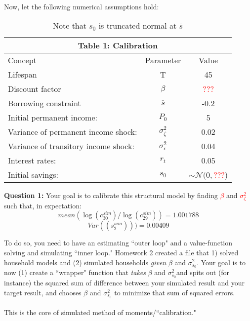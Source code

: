 \documentclass[11pt]{article}
\begin{document}
Now, let the following numerical assumptions hold:
\begin{table}[ht!]
\centering
\begin{tabular}{lcc}
\hline
\hline
\multicolumn{3}{c}{Table 1: Calibration}\\
\hline
Concept & Parameter & Value \\ 
Lifespan & T & 45 \\
Discount factor & $\beta$ & \textcolor{red}{???}\\
Borrowing constraint & $\overline{s}$ & -0.2 \\
Initial permanent income:  & $P_0$ & 5\\
Variance of permanent income shock:  & $\sigma^2_\zeta$ & 0.02\\
Variance of transitory income shock:  & $\sigma^2_\epsilon$ & 0.04\\
Interest rates:  & $r_{t}$ & 0.05\\
Initial savings:  & $s_{0}$ & $\sim\mathcal{N}(0,$\textcolor{red}{???})\\
\hline
\hline
\end{tabular}
\caption{Note that $s_0$ is truncated normal at $\overline{s}$}
\end{table}

\textbf{Question 1:}   Your goal is to calibrate this structural model by finding {\textcolor{red}{$\beta$}} and {\textcolor{red}{$\sigma^2_\zeta$}}  such that, in expectation:
$$mean(\log(c_{30}^{sim})/\log(c_{29}^{sim}))=1.001788$$
$$Var((s_2^{sim})))=0.00409$$

To do so, you need to have an estimating ``outer loop" and a value-function solving and simulating ``inner loop."  Homework 2 created a file that 1) solved household models and (2) simulated households \emph{given}  $\beta$ and $\sigma^2_{s_0}$.  Your goal is to now (1) create a ``wrapper" function that \emph{takes}  $\beta$ and $\sigma^2_{s_0}$and spits out (for instance) the squared sum of difference between your simulated result and your target result, and chooses  $\beta$ and $\sigma^2_{s_0}$ to minimize that sum of squared errors.\\
\ \\
This is the core of simulated method of moments/``calibration."  
\end{document}
